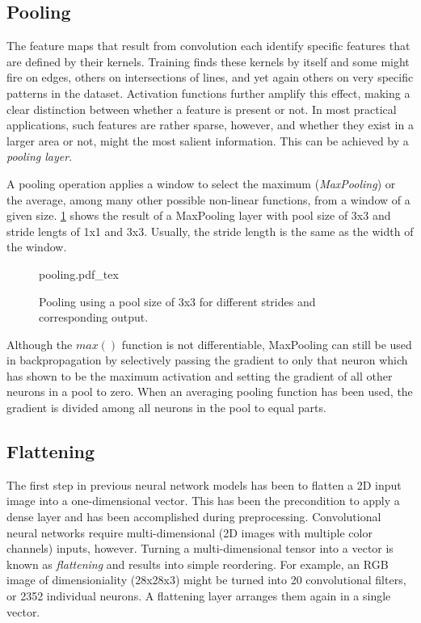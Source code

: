 \subsection{Pooling}

The feature maps that result from convolution each identify specific features that are defined by their kernels. Training finds these kernels by itself and some might fire on edges, others on intersections of lines, and yet again others on very specific patterns in the dataset. Activation functions further amplify this effect, making a clear distinction between whether a feature is present or not. In most practical applications, such features are rather sparse, however, and whether they exist in a larger area or not, might the most salient information. This can be achieved by a \textsl{pooling layer}.

A pooling operation applies a window to select the maximum (\textsl{MaxPooling}) or the average, among many other possible non-linear functions, from a window of a given size. \cref{fig:pooling} shows the result of a MaxPooling layer with pool size of 3x3 and stride lengts of 1x1 and 3x3. Usually, the stride length is the same as the width of the window.

\begin{figure}[htb]
    \centering
    \def\svgwidth{0.8\textwidth}
    {pooling.pdf_tex}
    \caption{Pooling using a pool size of 3x3 for different strides and corresponding output.\label{fig:pooling}}
\end{figure}

Although the $max()$ function is not differentiable, MaxPooling can still be used in backpropagation by selectively passing the gradient to only that neuron which has shown to be the maximum activation and setting the gradient of all other neurons in a pool to zero. When an averaging pooling function has been used, the gradient is divided among all neurons in the pool to equal parts.

\subsection{Flattening}

The first step in previous neural network models has been to flatten a 2D input image into a one-dimensional vector. This has been the precondition to apply a dense layer and has been accomplished during preprocessing. Convolutional neural networks require multi-dimensional (2D images with multiple color channels) inputs, however. Turning a multi-dimensional tensor into a vector is known as \textsl{flattening} and results into simple reordering. For example, an RGB image of dimensioniality (28x28x3) might be turned into 20 convolutional filters, or 2352 individual neurons. A flattening layer arranges them again in a single vector.

